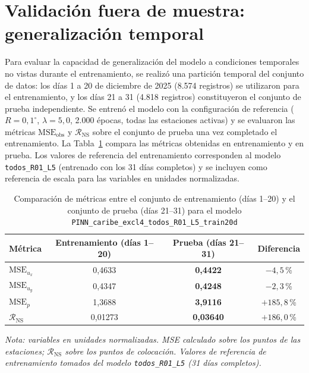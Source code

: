 \section{Validación fuera de muestra: generalización temporal}

Para evaluar la capacidad de generalización del modelo a condiciones temporales no vistas
durante el entrenamiento, se realizó una partición temporal del conjunto de datos:
los días 1 a 20 de diciembre de 2025 (8.574 registros) se utilizaron para el entrenamiento,
y los días 21 a 31 (4.818 registros) constituyeron el conjunto de prueba independiente.
Se entrenó el modelo con la configuración de referencia ($R = 0{,}1^{\circ}$, $\lambda = 5{,}0$,
2.000 épocas, todas las estaciones activas) y se evaluaron las métricas $\text{MSE}_{\text{obs}}$
y $\mathcal{R}_{\text{NS}}$ sobre el conjunto de prueba una vez completado el entrenamiento.
La Tabla~\ref{tab:validacion_prueba} compara las métricas obtenidas en entrenamiento y en prueba.
Los valores de referencia del entrenamiento corresponden al modelo \texttt{todos\_R01\_L5}
(entrenado con los 31 días completos) y se incluyen como referencia de escala para las variables
en unidades normalizadas.

\begin{table}[H]
\centering
\caption{Comparación de métricas entre el conjunto de entrenamiento (días 1–20) y el conjunto de prueba (días 21–31) para el modelo \texttt{PINN\_caribe\_excl4\_todos\_R01\_L5\_train20d}}
\label{tab:validacion_prueba}
\begin{tabular}{lccc}
\hline
Métrica & Entrenamiento (días 1–20) & Prueba (días 21–31) & Diferencia \\
\hline
$\text{MSE}_{u_x}$ & 0{,}4633 & \textbf{0{,}4422} & $-4{,}5$\,\% \\
$\text{MSE}_{u_y}$ & 0{,}4347 & \textbf{0{,}4248} & $-2{,}3$\,\% \\
$\text{MSE}_{p}$   & 1{,}3688 & \textbf{3{,}9116} & $+185{,}8$\,\% \\
$\mathcal{R}_{\text{NS}}$ & 0{,}01273 & \textbf{0{,}03640} & $+186{,}0$\,\% \\
\hline
\end{tabular}
\end{table}

\noindent\textit{Nota: variables en unidades normalizadas. MSE calculado sobre los puntos de las
estaciones; $\mathcal{R}_{\text{NS}}$ sobre los puntos de colocación. Valores de referencia de entrenamiento tomados del modelo
\texttt{todos\_R01\_L5} (31 días completos).}

